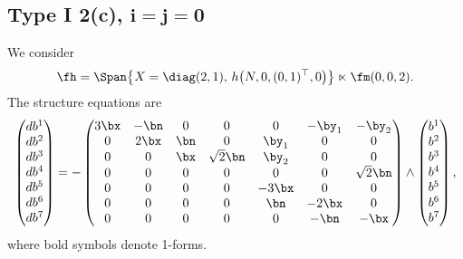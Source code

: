 \subsection[Type I 2(c), $i=j=0$]{Type I 2(c), $\boldsymbol{i=j=0}$}
We consider
\begin{gather*}\fh=\Span\big\{X=\diag(2,1),\, h\big(N,0,(0,1)^\top,0\big) \big\}\ltimes\fm(0,0,2).\end{gather*}
The structure equations are
\begin{gather}\label{EI2(c)}\left(\begin{matrix} db^1\\db^2\\db^3\\db^4\\db^5\\db^6\\db^7\end{matrix}\right) = -\left(
\begin{matrix}
3{\bx} &-\bn&0&0&0&-\by_1&-\by_2\\
0&2\bx&\bn&0&\by_1&0&0\\
0&0&\bx&\sqrt 2 \bn&\by_2&0&0\\
0&0&0&0&0&0&\sqrt 2 \bn\\
0&0&0&0&-3\bx&0&0\\
0&0&0&0&\bn&-2\bx&0\\
0&0&0&0&0&-\bn&-\bx
\end{matrix}\right) \wedge \left(\begin{matrix} b^1\\b^2\\b^3\\b^4\\b^5\\b^6\\b^7\end{matrix}\right),
\end{gather}
where bold symbols denote 1-forms.
